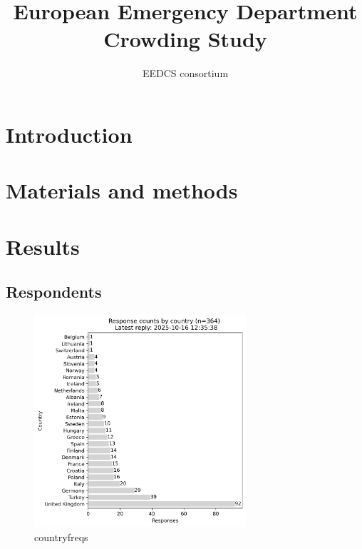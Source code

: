 \documentclass{article}
\title{European Emergency Department Crowding Study}
\author{EEDCS consortium}
\begin{document}
\maketitle


\begin{abstract}
    \lipsum[1]    
\end{abstract}


\section{Introduction}
\lipsum[2]
\section{Materials and methods}
\lipsum[3]
\section{Results}


\subsection{Respondents}




\begin{figure}[H]
    \centering
        \includegraphics[width=0.7\textwidth]{../output/plots/country_freqs}
        \caption{countryfreqs}
        \label{fig:country_freqs}
\end{figure}
\end{document}
